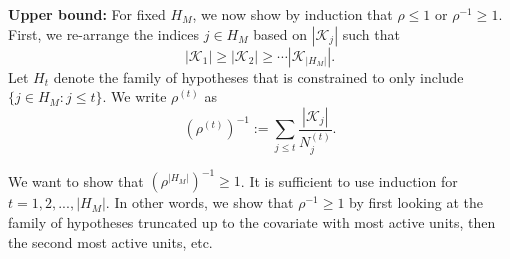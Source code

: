 \documentclass[11pt]{article}
\begin{document}
	\textbf{Upper bound: }For fixed $H_M$, we now show by induction that $\rho\leq 1$ or $\rho^{-1}\geq 1$. 
	First, we re-arrange the indices $j\in H_M$ based on $|\mathcal{K}_j|$ such that
	$$
	|\mathcal{K}_1|\geq |\mathcal{K}_2|\geq \cdots |\mathcal{K}_{|H_M|}| .
	$$
	Let $H_t$ denote the family of hypotheses that is constrained to only include $\{ j\in H_M: j\leq t\}$. We write $\rho^{(t)}$ as 
	\begin{equation}
		(\rho^{(t)})^{-1}:=\sum_{j\leq t}\frac{|\mathcal{K}_j|}{N_j^{(t)}}.
	\end{equation}
	
	We want to show that $(\rho^{|H_M|})^{-1}\geq 1$. It is sufficient to use induction for $t=1,2,...,|H_M|$. In other words, we show that $\rho^{-1}\geq 1$ by first looking at the family of hypotheses truncated up to the covariate with most active units, then the second most active units, etc.\\
\end{document}

